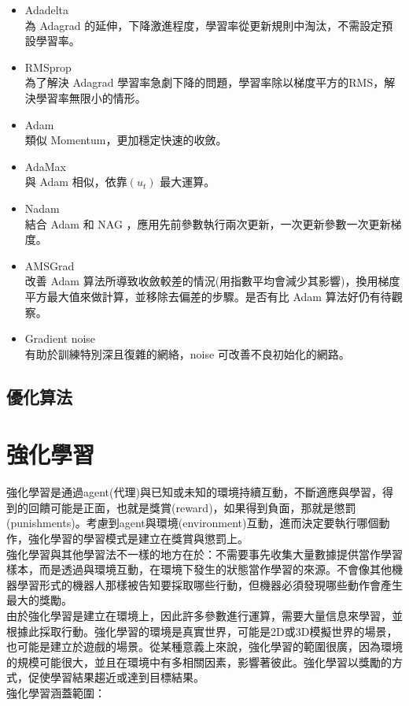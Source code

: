 \documentclass[14pt,a4paper]{report}  %
\begin{document}
\begin{itemize}
\item Adadelta\\
為 Adagrad 的延伸，下降激進程度，學習率從更新規則中淘汰，不需設定預設學習率。
\item RMSprop\\
為了解決 Adagrad 學習率急劇下降的問題，學習率除以梯度平方的RMS，解決學習率無限小的情形。
\item Adam\\
類似 Momentum，更加穩定快速的收斂。
\item AdaMax\\
與 Adam 相似，依靠$(u_t)$ 最大運算。
\item Nadam\\
結合 Adam 和 NAG ，應用先前參數執行兩次更新，一次更新參數一次更新梯度。
\item AMSGrad\\
改善 Adam 算法所導致收斂較差的情況(用指數平均會減少其影響)，換用梯度平方最大值來做計算，並移除去偏差的步驟。是否有比 Adam 算法好仍有待觀察。
\item Gradient noise\\[6pt]
有助於訓練特別深且復雜的網絡，noise 可改善不良初始化的網路。
\end{itemize}
\subsection{優化算法}
\newpage
\section{強化學習}
強化學習是通過agent(代理)與已知或未知的環境持續互動，不斷適應與學習，得到的回饋可能是正面，也就是獎賞(reward)，如果得到負面，那就是懲罰(punishments)。考慮到agent與環境(environment)互動，進而決定要執行哪個動作，強化學習的學習模式是建立在獎賞與懲罰上。\\
強化學習與其他學習法不一樣的地方在於：不需要事先收集大量數據提供當作學習樣本，而是透過與環境互動，在環境下發生的狀態當作學習的來源。不會像其他機器學習形式的機器人那樣被告知要採取哪些行動，但機器必須發現哪些動作會產生最大的獎勵。\\
由於強化學習是建立在環境上，因此許多參數進行運算，需要大量信息來學習，並根據此採取行動。強化學習的環境是真實世界，可能是2D或3D模擬世界的場景，也可能是建立於遊戲的場景。從某種意義上來說，強化學習的範圍很廣，因為環境的規模可能很大，並且在環境中有多相關因素，影響著彼此。強化學習以獎勵的方式，促使學習結果趨近或達到目標結果。\\
強化學習涵蓋範圍：\\
\end{document}
